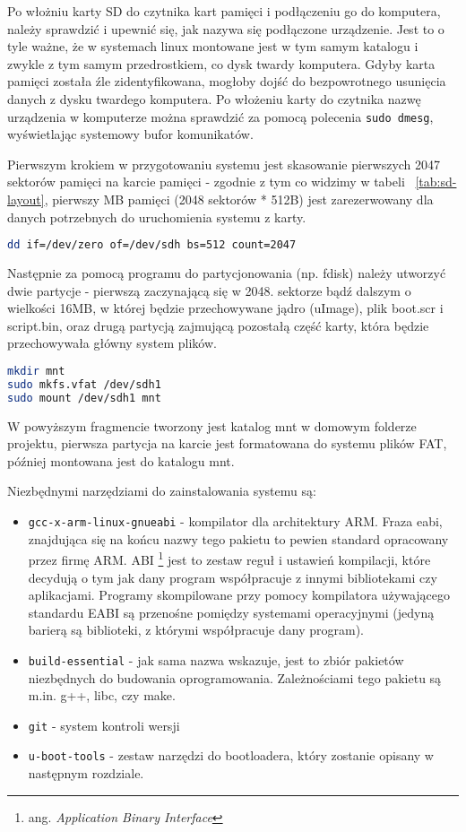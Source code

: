\par
Po włożniu karty SD do czytnika kart pamięci i podłączeniu go do komputera, należy sprawdzić i upewnić się, jak nazywa się podłączone urządzenie. Jest to o tyle ważne, że w systemach linux montowane jest w tym samym katalogu i zwykle z tym samym przedrostkiem, co dysk twardy komputera. Gdyby karta pamięci została źle zidentyfikowana, mogłoby dojść do bezpowrotnego usunięcia danych z dysku twardego komputera. Po włożeniu karty do czytnika nazwę urządzenia w komputerze można sprawdzić za pomocą polecenia \lstinline{sudo dmesg}, wyświetlając systemowy bufor komunikatów. 
\par
Pierwszym krokiem w przygotowaniu systemu jest skasowanie pierwszych 2047 sektorów pamięci na karcie pamięci - zgodnie z tym co widzimy w tabeli ~\ref{tab:sd-layout}, pierwszy MB pamięci (2048 sektorów * 512B) jest zarezerwowany dla danych potrzebnych do uruchomienia systemu z karty.
\par
\begin{lstlisting}[language=bash]
dd if=/dev/zero of=/dev/sdh bs=512 count=2047
\end{lstlisting}
\par
Następnie za pomocą programu do partycjonowania (np. fdisk) należy utworzyć dwie partycje - pierwszą zaczynającą się w 2048. sektorze bądź dalszym o wielkości 16MB, w której będzie przechowywane jądro (uImage), plik boot.scr i script.bin, oraz drugą partycją zajmującą pozostałą część karty, która będzie przechowywała główny system plików.
\par

\begin{lstlisting}[language=bash]
mkdir mnt
sudo mkfs.vfat /dev/sdh1
sudo mount /dev/sdh1 mnt
\end{lstlisting}

W powyższym fragmencie tworzony jest katalog mnt w domowym folderze projektu, pierwsza partycja na karcie jest formatowana do systemu plików FAT, później montowana jest do katalogu mnt.


Niezbędnymi narzędziami do zainstalowania systemu są:
\begin{itemize}
	\item {\lstinline{gcc-x-arm-linux-gnueabi}}  - kompilator dla architektury ARM. Fraza eabi, znajdująca się na końcu nazwy tego pakietu to pewien standard opracowany przez firmę ARM. ABI  \footnote{ang. \emph{Application Binary Interface}} jest to zestaw reguł i ustawień kompilacji, które decydują o tym jak dany program współpracuje z innymi bibliotekami czy aplikacjami. Programy skompilowane przy pomocy kompilatora używającego standardu EABI są przenośne pomiędzy systemami operacyjnymi (jedyną barierą są biblioteki, z którymi współpracuje dany program).
	\item {\lstinline{build-essential}} - jak sama nazwa wskazuje, jest to zbiór pakietów niezbędnych do budowania oprogramowania. Zależnościami tego pakietu są m.in. g++, libc, czy make.
	\item {\lstinline{git}} - system kontroli wersji
	\item {\lstinline{u-boot-tools}} - zestaw narzędzi do bootloadera, który zostanie opisany w następnym rozdziale.
\end{itemize}


